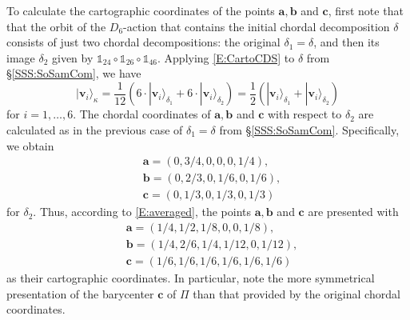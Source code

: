 \documentclass[12pt]{amsart}
\theoremstyle{plain}
\theoremstyle{definition}
\numberwithin{equation}{section}
\begin{document}
To calculate the cartographic coordinates of the points $\mathbf a, \mathbf b$ and $\mathbf c$, first note that that the orbit of the $D_6$-action that contains the initial chordal decomposition $\delta$ consists of just two chordal decompositions: the original $\delta_1 = \delta$, and then its image $\delta_2$ given by $\mathds 1_{24} \circ \mathds 1_{26} \circ \mathds 1_{46}$. Applying \eqref{E:CartoCDS} to $\delta$ from \S\ref{SSS:SoSamCom}, we have
\begin{equation}\label{E:averaged}
|\mathbf v_i\rangle_{\kappa} = \frac1{12} (6 \cdot |\mathbf v_i\rangle_{\delta_1} + 6 \cdot |\mathbf v_i\rangle_{\delta_2}) = \frac1{2} (|\mathbf v_i\rangle_{\delta_1} + |\mathbf v_i\rangle_{\delta_2})
\end{equation}
for $i = 1,\dots ,6$. The chordal coordinates of $\mathbf a, \mathbf b$ and $\mathbf c$ with respect to $\delta_2$ are calculated as in the previous case of $\delta_ 1=\delta$ from \S\ref{SSS:SoSamCom}. Specifically, we obtain
\begin{align*}
&\mathbf a = (0,3/4,0,0,0,1/4),\\
&\mathbf b = (0,2/3,0,1/6,0,1/6),\\
&\mathbf c = (0,1/3,0,1/3,0,1/3)
\end{align*}
for $\delta_2$. Thus, according to \eqref{E:averaged}, the points $\mathbf a, \mathbf b$ and $\mathbf c$ are presented with
\begin{align*}
&\mathbf a = (1/4,1/2,1/8,0,0,1/8),\\
&\mathbf b = (1/4,2/6,1/4,1/12,0,1/12),\\
&\mathbf c = (1/6,1/6,1/6,1/6,1/6,1/6)
\end{align*}
as their cartographic coordinates. In particular, note the more symmetrical presentation of the barycenter $\mathbf c$ of $\Pi$ than that provided by the original chordal coordinates.
\end{document}
